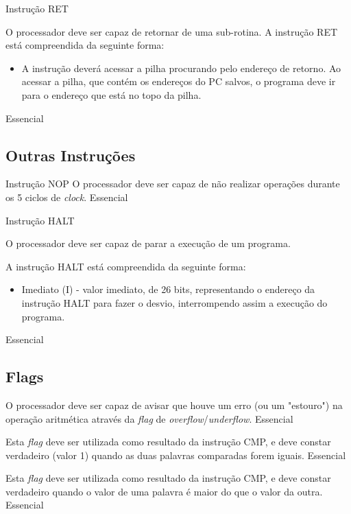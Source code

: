 \documentclass{article}
\begin{document}
\begin{functional}
      \requirement
      {Instrução RET}
      {O processador deve ser capaz de retornar de uma sub-rotina.
      A instrução RET está compreendida da seguinte forma:\\
      \begin{itemize}
         \item A instrução deverá acessar a pilha procurando pelo endereço de retorno. Ao acessar a pilha, que contém os endereços do PC salvos, o programa deve ir para o endereço que está no topo da pilha.
        \end{itemize}
        }
      {Essencial}

    \end{functional}

    \subsection{Outras Instruções}

    \begin{functional}

      \requirement
      {Instrução NOP}
      {O processador deve ser capaz de não realizar operações durante os 5 ciclos de \textit{clock}.}
      {Essencial}

      \requirement
      {Instrução HALT}
      {O processador deve ser capaz de parar a execução de um programa.
     
     A instrução HALT está compreendida da seguinte forma:\\      
      \begin{itemize}
       \item Imediato (I) - valor imediato, de 26 bits, representando o endereço da instrução HALT para fazer o desvio, interrompendo assim a execução do programa.
      \end{itemize}
      }
      {Essencial}

    \end{functional}

    \subsection{Flags}

    \begin{functional}

      {O processador deve ser capaz de avisar que houve um erro (ou um "estouro") na operação aritmética através da \textit{flag} de \textit{overflow}/\textit{underflow}.}
      {Essencial}

      {Esta \textit{flag} deve ser utilizada como resultado da instrução CMP, e deve constar verdadeiro (valor 1) quando as duas palavras comparadas forem iguais.}
      {Essencial}

      {Esta \textit{flag} deve ser utilizada como resultado da instrução CMP, e deve constar verdadeiro quando o valor de uma palavra é maior do que o valor da outra.}
      {Essencial}

     \end{functional}
\end{document}
